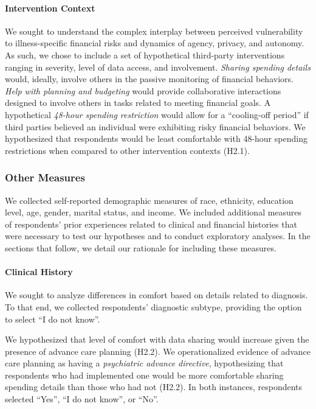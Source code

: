 \documentclass[10pt]{article}
\begin{document}
\paragraph{Intervention Context}

We sought to understand the complex interplay between perceived vulnerability to illness-specific financial risks and dynamics of agency, privacy, and autonomy. As such, we chose to include a set of hypothetical third-party interventions ranging in severity, level of data access, and involvement. \emph{Sharing spending details} would, ideally, involve others in the passive monitoring of financial behaviors. \emph{Help with planning and budgeting} would provide collaborative interactions designed to involve others in tasks related to meeting financial goals. A hypothetical \emph{48-hour spending restriction} would allow for a ``cooling-off period'' \cite{blairfinancial2022, farrwhy2019} if third parties believed an individual were exhibiting risky financial behaviors. We hypothesized that respondents would be least comfortable with 48-hour spending restrictions when compared to other intervention contexts (H2.1).


\subsubsection{Other Measures}

We collected self-reported demographic measures of race, ethnicity, education level, age, gender, marital status, and income. We included additional measures of respondents' prior experiences related to clinical and financial histories that were necessary to test our hypotheses and to conduct exploratory analyses. In the sections that follow, we detail our rationale for including these measures.

\paragraph{Clinical History}

We sought to analyze differences in comfort based on details related to diagnosis. To that end, we collected respondents' diagnostic subtype, providing the option to select ``I do not know''.

We hypothesized that level of comfort with data sharing would increase given the presence of advance care planning (H2.2). We operationalized evidence of advance care planning as having a \emph{psychiatric advance directive}, hypothesizing that respondents who had implemented one would be more comfortable sharing spending details than those who had not (H2.2). In both instances, respondents selected ``Yes'', ``I do not know'', or ``No''.
\end{document}
